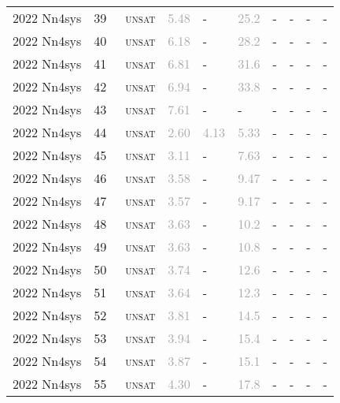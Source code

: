 \begin{center}
{\begin{longtable}{@{}llllllllll@{}}
2022 Nn4sys & 39 & ~\textsc{unsat} & \textcolor{darkgray}{5.48} & - & \textcolor{darkgray}{25.2} & - & - & - & - \\
2022 Nn4sys & 40 & ~\textsc{unsat} & \textcolor{darkgray}{6.18} & - & \textcolor{darkgray}{28.2} & - & - & - & - \\
2022 Nn4sys & 41 & ~\textsc{unsat} & \textcolor{darkgray}{6.81} & - & \textcolor{darkgray}{31.6} & - & - & - & - \\
2022 Nn4sys & 42 & ~\textsc{unsat} & \textcolor{darkgray}{6.94} & - & \textcolor{darkgray}{33.8} & - & - & - & - \\
2022 Nn4sys & 43 & ~\textsc{unsat} & \textcolor{darkgray}{7.61} & - & - & - & - & - & - \\
2022 Nn4sys & 44 & ~\textsc{unsat} & \textcolor{darkgray}{2.60} & \textcolor{darkgray}{4.13} & \textcolor{darkgray}{5.33} & - & - & - & - \\
2022 Nn4sys & 45 & ~\textsc{unsat} & \textcolor{darkgray}{3.11} & - & \textcolor{darkgray}{7.63} & - & - & - & - \\
2022 Nn4sys & 46 & ~\textsc{unsat} & \textcolor{darkgray}{3.58} & - & \textcolor{darkgray}{9.47} & - & - & - & - \\
2022 Nn4sys & 47 & ~\textsc{unsat} & \textcolor{darkgray}{3.57} & - & \textcolor{darkgray}{9.17} & - & - & - & - \\
2022 Nn4sys & 48 & ~\textsc{unsat} & \textcolor{darkgray}{3.63} & - & \textcolor{darkgray}{10.2} & - & - & - & - \\
2022 Nn4sys & 49 & ~\textsc{unsat} & \textcolor{darkgray}{3.63} & - & \textcolor{darkgray}{10.8} & - & - & - & - \\
2022 Nn4sys & 50 & ~\textsc{unsat} & \textcolor{darkgray}{3.74} & - & \textcolor{darkgray}{12.6} & - & - & - & - \\
2022 Nn4sys & 51 & ~\textsc{unsat} & \textcolor{darkgray}{3.64} & - & \textcolor{darkgray}{12.3} & - & - & - & - \\
2022 Nn4sys & 52 & ~\textsc{unsat} & \textcolor{darkgray}{3.81} & - & \textcolor{darkgray}{14.5} & - & - & - & - \\
2022 Nn4sys & 53 & ~\textsc{unsat} & \textcolor{darkgray}{3.94} & - & \textcolor{darkgray}{15.4} & - & - & - & - \\
2022 Nn4sys & 54 & ~\textsc{unsat} & \textcolor{darkgray}{3.87} & - & \textcolor{darkgray}{15.1} & - & - & - & - \\
2022 Nn4sys & 55 & ~\textsc{unsat} & \textcolor{darkgray}{4.30} & - & \textcolor{darkgray}{17.8} & - & - & - & - \\

\end{longtable}}
\end{center}

